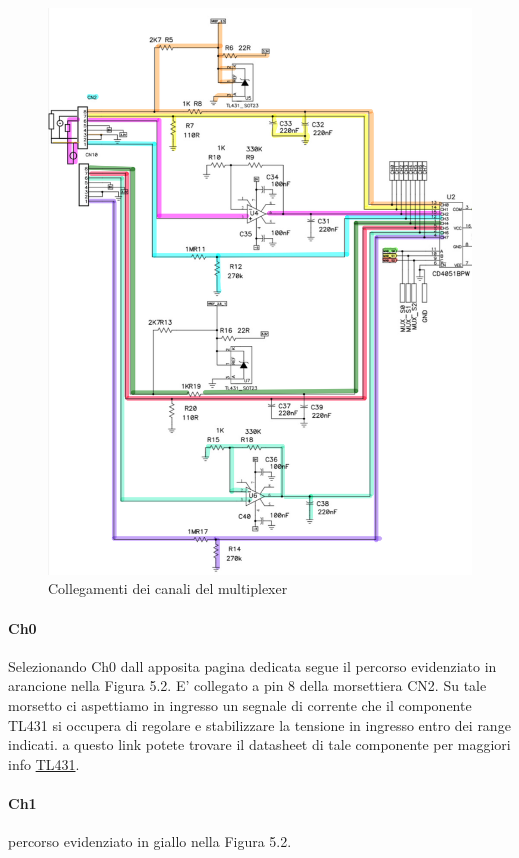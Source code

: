 \documentclass[12pt,a4paper]{report}
\begin{document}
\begin{figure}[H]
    \centering
    \includegraphics[width=\linewidth]{../image/channelMultiplex.png}
    \caption{Collegamenti dei canali del multiplexer}
\end{figure}

\paragraph{Ch0}
Selezionando Ch0 dall apposita pagina dedicata segue il percorso evidenziato in arancione nella Figura 5.2.
E' collegato a pin 8 della morsettiera CN2.
Su tale morsetto ci aspettiamo in ingresso un segnale di corrente che il componente TL431 si occupera di regolare e stabilizzare la tensione in ingresso entro dei range indicati.
a questo link potete trovare il datasheet di tale componente per maggiori info \href{https://www.ti.com/lit/ds/symlink/tl431.pdf}{TL431}.

\paragraph{Ch1}
percorso evidenziato in giallo nella Figura 5.2.
\end{document}
